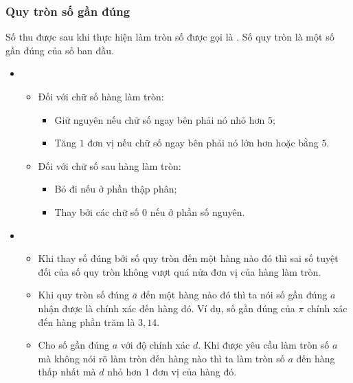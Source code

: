 \subsubsection{Quy tròn số gần đúng}
Số thu được sau khi thực hiện làm tròn số được gọi là . Số quy tròn là một số gần đúng của số ban đầu.
\begin{itemize}
	\item [\iconMT] 
	\begin{itemize}
		\item [\ding{172}] Đối với chữ số hàng làm tròn:
		\begin{boxkn}
			\begin{itemize}
				\item Giữ nguyên nếu chữ số ngay bên phải nó nhỏ hơn $5$;
				\item Tăng $1$ đơn vị nếu chữ số ngay bên phải nó lớn hơn hoặc bằng $5$.
			\end{itemize}
		\end{boxkn}
		\item [\ding{173}] Đối với chữ số sau hàng làm tròn:
		\begin{boxkn}
			\begin{itemize}
				\item Bỏ đi nếu ở phần thập phân;
				\item Thay bởi các chữ số $0$ nếu ở phần số nguyên.
			\end{itemize}
		\end{boxkn}
	\end{itemize}
	\item [\iconMT] 
	\begin{itemize}
		\item[\ding{172}]  Khi thay số đúng bởi số quy tròn đến một hàng nào đó thì sai số tuyệt đối của số quy tròn không vượt quá nửa đơn vị của hàng làm tròn.
		\item[\ding{173}] Khi quy tròn số đúng $\overline{a}$ đến một hàng nào đó thì ta nói số gần đúng $a$ nhận được là chính xác đến hàng đó. Ví dụ, số gần đúng của $\pi$ chính xác đến hàng phần trăm là $3,14$.
		\item[\ding{174}] Cho số gần đúng $a$ với độ chính xác $d$. Khi được yêu cầu làm tròn số $a$ mà không nói rõ làm tròn đến hàng nào thì ta làm tròn số $a$ đến hàng thấp nhất mà $d$ nhỏ hơn $1$ đơn vị của hàng đó.
	\end{itemize}
\end{itemize}